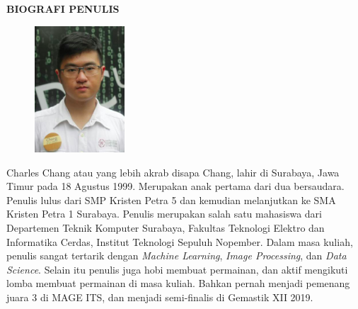\begin{center}
  \Large
  \textbf{BIOGRAFI PENULIS}
\end{center}


\vspace{2ex}

\begin{figure}
  \centering
  \vspace{-3ex}
  \includegraphics[width=0.3\textwidth]{gambar/chang.png}
  \vspace{-4ex}
\end{figure}

\hspace{-6ex}Charles Chang atau yang lebih akrab disapa Chang, lahir di Surabaya, Jawa Timur pada 18 Agustus 1999. Merupakan anak pertama dari dua bersaudara. Penulis lulus dari SMP Kristen Petra 5 dan kemudian melanjutkan ke SMA Kristen Petra 1 Surabaya. Penulis merupakan salah satu mahasiswa dari Departemen Teknik Komputer Surabaya, Fakultas Teknologi Elektro dan Informatika Cerdas, Institut Teknologi Sepuluh Nopember. Dalam masa kuliah, penulis sangat tertarik dengan \textit{Machine Learning}, \textit{Image Processing}, dan \textit{Data Science}. Selain itu penulis juga hobi membuat permainan, dan aktif mengikuti lomba membuat permainan di masa kuliah. Bahkan pernah menjadi pemenang juara 3 di MAGE ITS, dan menjadi semi-finalis di Gemastik XII 2019.